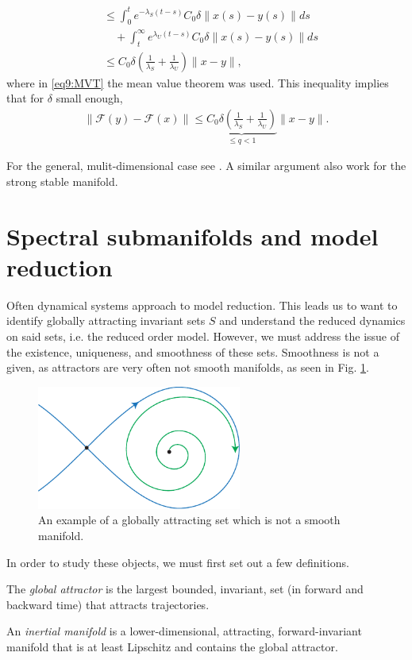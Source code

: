 \begin{enumerate}
\begin{align}
					    &\leq \int_{0}^{t} e^{-\lambda _{S}(t-s)}C_0 \delta \| x(s) - y(s)\| ds \\
					    &\quad + \int_{t}^{\infty } e^{\lambda _{U}(t-s)}C_0 \delta \|x(s) - y(s)\| ds \label{eq9:MVT}\\
					    &\leq C_0 \delta \left(\frac{1}{\lambda _{S}} + \frac{1}{\lambda _{U}} \right) \| x - y\|,
\end{align}
where in \eqref{eq9:MVT} the mean value theorem was used. This inequality implies that for $\delta$ small enough,
\begin{align}
	\|\mathcal{F}(y) - \mathcal{F}(x) \| \leq \underbrace{C_0 \delta \left( \frac{1}{\lambda_S} + \frac{1}{\lambda _{U}}\right) }_{\leq q < 1} \| x - y\|.
\end{align}
\end{enumerate}
For the general, mulit-dimensional case see \cite{Chicone}. A similar argument also work for the strong stable manifold.

\section{Spectral submanifolds and model reduction}
Often dynamical systems approach to model reduction. This leads us to want to identify globally attracting invariant sets $S$ and understand the reduced dynamics on said sets, i.e. the reduced order model. However, we must address the issue of the existence, uniqueness, and smoothness of these sets. Smoothness is not a given, as attractors are very often not smooth manifolds, as seen in Fig. \ref{fig:nonsmooth_set}.
\begin{figure}[h!]
	\centering
	\includegraphics[width=0.6\textwidth]{figures/ch9/27nonsmooth_set.pdf}
	\caption{An example of a globally attracting set which is not a smooth manifold.}
	\label{fig:nonsmooth_set}
\end{figure}

In order to study these objects, we must first set out a few definitions.
\begin{definition}
	The \emph{global attractor} is the largest bounded, invariant, set (in forward and backward time) that attracts trajectories.
\end{definition}
\begin{definition}
An \emph{inertial manifold} is a lower-dimensional, attracting, forward-invariant manifold that is at least Lipschitz and contains the global attractor.
\end{definition}

